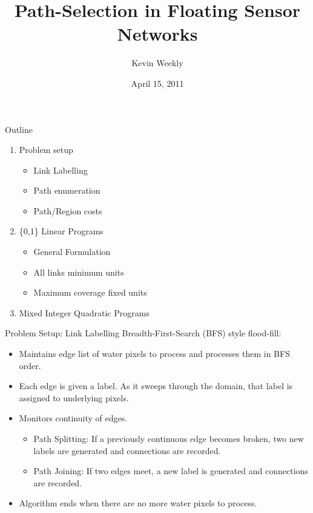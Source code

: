 \documentclass{beamer}
\title{Path-Selection in Floating Sensor Networks}
\author[K. Weekly]{Kevin Weekly}
\institute[UCB]{
  Dept. of Electrical Engineering and Computer Sciences\\
  University of California, Berkeley \\
}
\date{April 15, 2011}
\begin{document}
\begin{frame}[plain]
  \titlepage
\end{frame}


\begin{frame}{Outline}
\begin{enumerate}
  \item Problem setup
 \begin{itemize}
  \item Link Labelling
  \item Path enumeration
  \item Path/Region costs
 \end{itemize}

  \item \{0,1\} Linear Programs
  \begin{itemize}
  \item General Formulation
  \item All links minimum units
  \item Maximum coverage fixed units
  \end{itemize}

  \item Mixed Integer Quadratic Programs

\end{enumerate}
\end{frame}


\begin{frame}{Problem Setup: Link Labelling}
Breadth-First-Search (BFS) style flood-fill:
\begin{itemize}
   \item Maintains edge list of water pixels to process and processes them in BFS order.
   \item Each edge is given a label. As it sweeps through the domain, that label is assigned to underlying pixels.
   \item Monitors continuity of edges.
\begin{itemize}
    \item Path Splitting: If a previously continuous edge becomes broken, two new labels are generated and connections are recorded. 
    \item Path Joining: If two edges meet, a new label is generated and connections are recorded.
\end{itemize}
   \item Algorithm ends when there are no more water pixels to process.
\end{itemize}

\end{frame}
\end{document}

